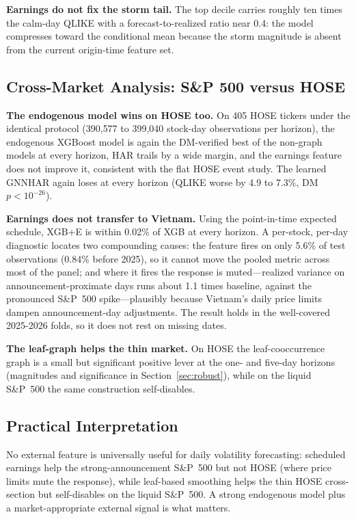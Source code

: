 \documentclass[runningheads]{llncs}
\begin{document}
\textbf{Earnings do not fix the storm tail.} The top decile carries roughly ten times the calm-day QLIKE
with a forecast-to-realized ratio near 0.4: the model compresses toward the conditional mean because the
storm magnitude is absent from the current origin-time feature set.

\subsection{Cross-Market Analysis: S\&P 500 versus HOSE}\label{sec:hose}
\textbf{The endogenous model wins on HOSE too.} On 405 HOSE tickers under the identical protocol
(390{,}577 to 399{,}040 stock-day observations per horizon), the endogenous XGBoost model is again the
DM-verified best of the non-graph models at every horizon, HAR trails by a wide margin, and the earnings
feature does not improve it, consistent with the flat HOSE event study. The learned GNNHAR again loses at
every horizon (QLIKE worse by 4.9 to 7.3\%, DM $p<10^{-26}$).

\textbf{Earnings does not transfer to Vietnam.} Using the point-in-time expected schedule, XGB+E is within
0.02\% of XGB at every horizon. A per-stock, per-day diagnostic locates two compounding causes: the feature
fires on only 5.6\% of test observations (0.84\% before 2025), so it cannot move the pooled metric across
most of the panel; and where it fires the response is muted---realized variance on announcement-proximate
days runs about 1.1 times baseline, against the pronounced S\&P~500 spike---plausibly because Vietnam's
daily price limits dampen announcement-day adjustments. The result holds in the well-covered 2025-2026
folds, so it does not rest on missing dates.

\textbf{The leaf-graph helps the thin market.} On HOSE the leaf-cooccurrence graph is a small but
significant positive lever at the one- and five-day horizons (magnitudes and significance in
Section~\ref{sec:robust}), while on the liquid S\&P~500 the same construction self-disables.

\subsection{Practical Interpretation}
No external feature is universally useful for daily volatility forecasting: scheduled earnings help the
strong-announcement S\&P~500 but not HOSE (where price limits mute the response), while leaf-based
smoothing helps the thin HOSE cross-section but self-disables on the liquid S\&P~500. A strong endogenous
model plus a market-appropriate external signal is what matters.
\end{document}
